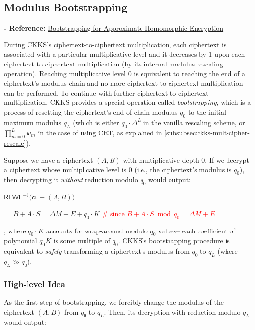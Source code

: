 \subsection{Modulus Bootstrapping}
\label{subsec:ckks-bootstrapping}


\textbf{- Reference:} 
\href{https://eprint.iacr.org/2018/153.pdf}{Bootstrapping for Approximate Homomorphic Encryption}~\cite{ckks}

During CKKS's ciphertext-to-ciphertext multiplication, each ciphertext is associated with a particular multiplicative level and it decreases by 1 upon each ciphertext-to-ciphertext multiplication (by its internal modulus rescaling operation). Reaching multiplicative level 0 is equivalent to reaching the end of a ciphertext's modulus chain and no more ciphertext-to-ciphertext multiplication can be performed. To continue with further ciphertext-to-ciphertext multiplication, CKKS provides a special operation called \textit{bootstrapping}, which is a process of resetting the ciphertext's end-of-chain modulus $q_0$ to the initial maximum modulus $q_L$ (which is either $q_0\cdot\Delta^{L}$ in the vanilla rescaling scheme, or $\prod\limits_{m=0}^{L}w_m$ in the case of using CRT, as explained in \autoref{subsubsec:ckks-mult-cipher-rescale}). 

Suppose we have a ciphertext $(A, B)$ with multiplicative depth 0. If we decrypt a ciphertext whose multiplicative level is 0 (i.e., the ciphertext's modulus is $q_0$), then decrypting it \textit{without} reduction modulo $q_0$ would output:

$\textsf{RLWE}^{-1}\textbf{(}\textsf{ct} = (A, B)\textbf{)}$

$ = B + A\cdot S = \Delta M + E + q_0\cdot K$ \textcolor{red}{ \# since $B + A\cdot S \bmod q_0 = \Delta M + E$}

, where $q_0 \cdot K$ accounts for wrap-around modulo $q_0$ values-- each coefficient of polynomial $q_0K$ is some multiple of $q_0$. CKKS's bootstrapping procedure is equivalent to \textit{safely} transforming a ciphertext's modulus from $q_0$ to $q_L$ (where $q_L \gg q_0$).



\subsubsection{High-level Idea}
\label{subsubsec:ckks-bootstrapping-high-level}

As the first step of bootstrapping, we forcibly change the modulus of the ciphertext $(A, B)$ from $q_0$ to $q_L$. Then, its decryption with reduction modulo $q_L$ would output:

